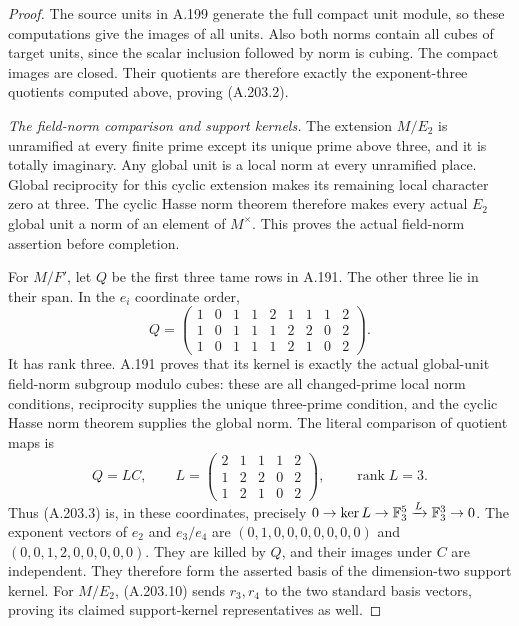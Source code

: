 \begin{proof}
The source units in A.199 generate the full compact
unit module, so these computations give the images of
all units.  Also both norms contain all cubes of target
units, since the scalar inclusion followed by norm is
cubing.  The compact images are closed.  Their quotients
are therefore exactly the exponent-three quotients
computed above, proving (A.203.2).

\emph{The field-norm comparison and support kernels.}
The extension \(M/E_2\) is unramified at every finite
prime except its unique prime above three, and it is
totally imaginary.  Any global unit is a local norm at
every unramified place.  Global reciprocity for this
cyclic extension makes its remaining local character
zero at three.  The cyclic Hasse norm theorem
\cite[Chapter VIII, Theorem 3.1, printed p.~234]{MilneCFT}
therefore makes every actual \(E_2\) global unit a norm
of an element of \(M^\times\).  This proves the actual
field-norm assertion before completion.

For \(M/F'\), let \(Q\) be the first three tame rows
in A.191.  The other three lie in their span.  In the
\(e_i\) coordinate order,
\[
 Q=\begin{pmatrix}
 1&0&1&1&2&1&1&1&2\\
 1&0&1&1&1&2&2&0&2\\
 1&0&1&1&1&2&1&0&2
 \end{pmatrix}.
\tag{A.203.13}
\]
It has rank three.  A.191 proves that its kernel is
exactly the actual global-unit field-norm subgroup
modulo cubes: these are all changed-prime local norm
conditions, reciprocity supplies the unique three-prime
condition, and the cyclic Hasse norm theorem supplies
the global norm.
The literal comparison of quotient maps is
\[
 Q=LC,\qquad
 L=\begin{pmatrix}
 2&1&1&1&2\\
 1&2&2&0&2\\
 1&2&1&0&2
 \end{pmatrix},\qquad \operatorname{rank}L=3.
\tag{A.203.14}
\]
Thus (A.203.3) is, in these coordinates, precisely
\(0\to\ker L\to\mathbb F_3^5\xrightarrow{L}\mathbb F_3^3\to0\).
The exponent vectors of \(e_2\) and \(e_3/e_4\) are
\((0,1,0,0,0,0,0,0,0)\) and
\((0,0,1,2,0,0,0,0,0)\).
They are killed by \(Q\), and their images under \(C\)
are independent.  They therefore form the asserted
basis of the dimension-two support kernel.
For \(M/E_2\), (A.203.10) sends \(r_3,r_4\) to
the two standard basis vectors, proving its claimed
support-kernel representatives as well.


\end{proof}
